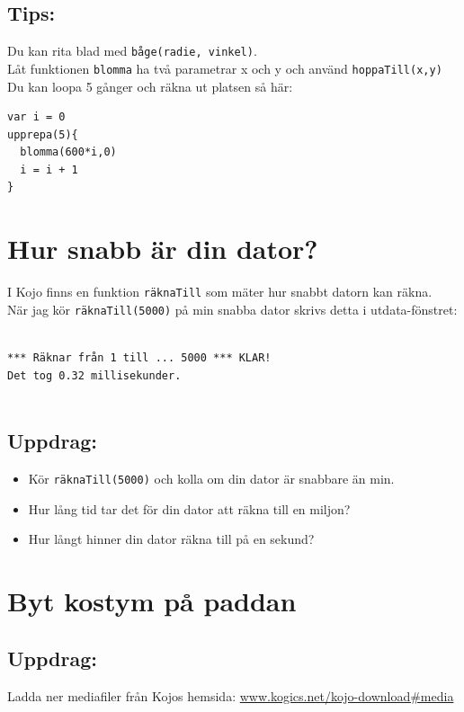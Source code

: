 \section*{\color{OliveGreen}Tips:}
Du kan rita blad med \lstinline{båge(radie, vinkel)}. \\
Låt funktionen \lstinline{blomma} ha två parametrar x och y och använd \lstinline{hoppaTill(x,y)}\\
Du kan loopa 5 gånger och räkna ut platsen så här:

\begin{lstlisting}[basicstyle={\ttfamily\fontsize{18}{22}\selectfont},numbers=none]
var i = 0          
upprepa(5){
  blomma(600*i,0)
  i = i + 1        
}
\end{lstlisting}
        
\chapter{Hur snabb är din dator?}I Kojo finns en funktion \lstinline{räknaTill} som mäter hur snabbt datorn kan räkna.\\
När jag kör \lstinline{räknaTill(5000)} på min snabba dator skrivs detta i utdata-fönstret:

\begin{lstlisting}[numbers=none]

*** Räknar från 1 till ... 5000 *** KLAR!
Det tog 0.32 millisekunder.
      
\end{lstlisting}
        
\section*{\color{BrickRed}Uppdrag:}


\begin{itemize}

\item {Kör \lstinline{räknaTill(5000)} och kolla om din dator är snabbare än min.}
\item {Hur lång tid tar det för din dator att räkna till en miljon?}
\item {Hur långt hinner din dator räkna till på en sekund?}

\end{itemize}


\chapter{Byt kostym på paddan}\section*{\color{BrickRed}Uppdrag:}
Ladda ner mediafiler från Kojos hemsida:
\href{http://www.kogics.net/kojo-download#media}{www.kogics.net/kojo-download\#media}
\\


